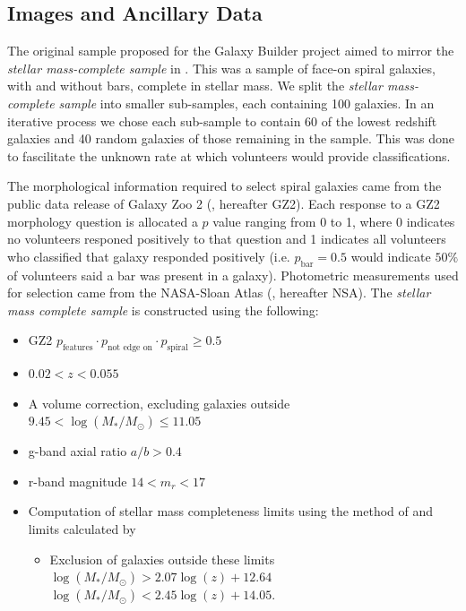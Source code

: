 \documentclass[../main.tex]{subfiles}
\begin{document}
\subsection{Images and Ancillary Data}
\label{sec:data}
The original sample proposed for the Galaxy Builder project aimed to mirror the \textit{stellar mass-complete sample} in \citet{2017MNRAS.472.2263H}. This was a sample of face-on spiral galaxies, with and without bars, complete in  stellar mass. We split the \textit{stellar mass-complete sample} into smaller sub-samples, each containing 100 galaxies. In an iterative process we chose each sub-sample to contain 60 of the lowest redshift galaxies and 40 random galaxies of those remaining in the sample. This was done to fascilitate the unknown rate at which volunteers would provide classifications.

The morphological information required to select spiral galaxies came from the public data release of Galaxy Zoo 2 (\citealt{Willett2013:1308.3496v2}, hereafter GZ2). Each response to a GZ2 morphology question is allocated a $p$ value ranging from 0 to 1, where 0 indicates no volunteers responed positively to that question and 1 indicates all volunteers who classified that galaxy responded positively (i.e. $p_\text{bar} = 0.5$ would indicate $50\%$ of volunteers said a bar was present in a galaxy). Photometric measurements used for selection came from the NASA-Sloan Atlas (\citealt{2011AJ....142...31B}, hereafter NSA). The \textit{stellar mass complete sample} is constructed using the following:

\begin{itemize}
  \item GZ2 $p_\text{features} \cdot p_\text{not edge on} \cdot p_\text{spiral} \ge 0.5$
  \item $0.02 < z < 0.055$
  \item A volume correction, excluding galaxies outside $9.45 < \log(M_* / M_\odot) \le 11.05$
  \item g-band axial ratio $a/b > 0.4$
  \item r-band magnitude $14 < m_r < 17$
  \item Computation of stellar mass completeness limits using the method of \citet{Pozzetti2009:0907.5416v2} and limits calculated by \citet{2017MNRAS.472.2263H}
  \begin{itemize}
    \item Exclusion of galaxies outside these limits\\
      $\log({M_* / M_\odot}) > 2.07\log(z) + 12.64$\\
      $\log({M_* / M_\odot}) < 2.45\log(z) + 14.05$.
  \end{itemize}
\end{itemize}
\end{document}
